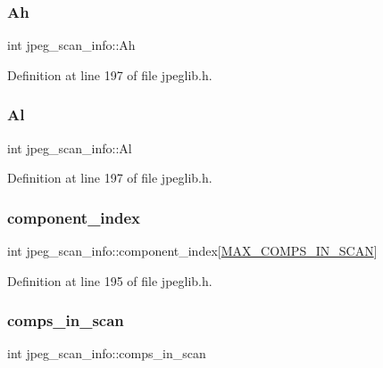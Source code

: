 \subsubsection{\texorpdfstring{Ah}{Ah}}
{\footnotesize\ttfamily int jpeg\+\_\+scan\+\_\+info\+::\+Ah}



Definition at line 197 of file jpeglib.\+h.

\mbox{\label{structjpeg__scan__info_a89cc9e990977c50b2b2058e6b9526e67}} 
\subsubsection{\texorpdfstring{Al}{Al}}
{\footnotesize\ttfamily int jpeg\+\_\+scan\+\_\+info\+::\+Al}



Definition at line 197 of file jpeglib.\+h.

\mbox{\label{structjpeg__scan__info_a041f1af60508517345c1b76c48ee6567}} 
\subsubsection{\texorpdfstring{component\_index}{component\_index}}
{\footnotesize\ttfamily int jpeg\+\_\+scan\+\_\+info\+::component\+\_\+index\mbox{[}\mbox{\hyperlink{jpeglib_8h_adc7013da016c19051dc623fb3d8b35b4}{M\+A\+X\+\_\+\+C\+O\+M\+P\+S\+\_\+\+I\+N\+\_\+\+S\+C\+AN}}\mbox{]}}



Definition at line 195 of file jpeglib.\+h.

\mbox{\label{structjpeg__scan__info_addd94bff3ee52f961cf6fda5ea86ddca}} 
\subsubsection{\texorpdfstring{comps\_in\_scan}{comps\_in\_scan}}
{\footnotesize\ttfamily int jpeg\+\_\+scan\+\_\+info\+::comps\+\_\+in\+\_\+scan}



